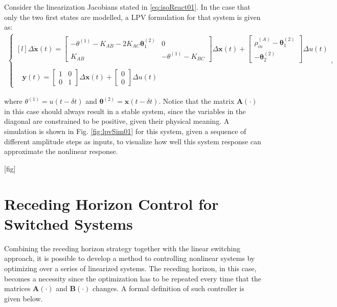 \documentclass[a4paper,11pt]{book}
\numberwithin{figure}{chapter}
\numberwithin{equation}{chapter}
\numberwithin{table}{chapter}
\theoremstyle{definition}
\begin{document}
Consider the linearization Jacobians stated in \eqref{eq:isoReact01}. In the case that only the two first states are modelled, a LPV formulation for that system is given as:
\begin{align}   \label{eq:isoReactLPV}
\left\{ \begin{matrix*}[l]
    \Delta \dot{\bm{x}}(t) = \begin{bmatrix}
        -\theta^{(1)} - K_{AB} - 2K_{AC} \bm{\theta}^{(2)}_1 & 0 \\ K_{AB} & - \theta^{(1)} - K_{BC} 
    \end{bmatrix} \Delta \bm{x}(t) +  \begin{bmatrix}
        \rho_{in}^{(A)} - \bm{\theta}^{(2)}_1 \\ - \bm{\theta}^{(2)}_2
    \end{bmatrix} \Delta u(t) \\ \\
    \phantom{\Delta} \bm{y}(t) = \begin{bmatrix}
        1 & 0  \\ 0 & 1 
    \end{bmatrix} \Delta \bm{x}(t) + \begin{bmatrix}
        0 \\ 0 
    \end{bmatrix} \Delta u(t)
\end{matrix*} \right.
,\end{align}

\noindent where $\theta^{(1)} = u(t-\delta t)$ and $\bm{\theta}^{(2)} = \bm{x}(t-\delta t)$. Notice that the matrix $\bm{A}(\cdot)$ in this case should always result in a stable system, since the variables in the diagonal are constrained to be positive, given their physical meaning. A simulation is shown in Fig. \ref{fig:lpvSim01} for this system, given a sequence of different amplitude steps as inputs, to visualize how well this system response can approximate the nonlinear response.

[fig]

\section{Receding Horizon Control for Switched Systems}

Combining the receding horizon strategy together with the linear switching approach, it is possible to develop a method to controlling nonlinear systems by optimizing over a series of linearized systems. The receding horizon, in this case, becomes a necessity since the optimization has to be repeated every time that the matrices $\bm{A}(\cdot)$ and $\bm{B}(\cdot)$ changes. A formal definition of such controller is given below.
\end{document}
